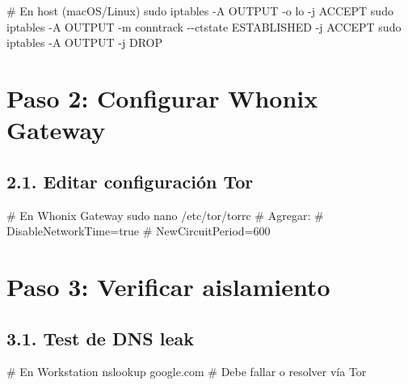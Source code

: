 \documentclass[
  letterpaper,
]{report}
\newenvironment{Shaded}{\begin{snugshade}}{\end{snugshade}}
\newcommand{\AttributeTok}[1]{\textcolor[rgb]{0.40,0.45,0.13}{#1}}
\newcommand{\CommentTok}[1]{\textcolor[rgb]{0.37,0.37,0.37}{#1}}
\newcommand{\ExtensionTok}[1]{\textcolor[rgb]{0.00,0.23,0.31}{#1}}
\newcommand{\FunctionTok}[1]{\textcolor[rgb]{0.28,0.35,0.67}{#1}}
\newcommand{\NormalTok}[1]{\textcolor[rgb]{0.00,0.23,0.31}{#1}}
\begin{document}
\begin{Shaded}
\begin{Highlighting}[]
\CommentTok{\# En host (macOS/Linux)}
\FunctionTok{sudo}\NormalTok{ iptables }\AttributeTok{{-}A}\NormalTok{ OUTPUT }\AttributeTok{{-}o}\NormalTok{ lo }\AttributeTok{{-}j}\NormalTok{ ACCEPT}
\FunctionTok{sudo}\NormalTok{ iptables }\AttributeTok{{-}A}\NormalTok{ OUTPUT }\AttributeTok{{-}m}\NormalTok{ conntrack }\AttributeTok{{-}{-}ctstate}\NormalTok{ ESTABLISHED }\AttributeTok{{-}j}\NormalTok{ ACCEPT}
\FunctionTok{sudo}\NormalTok{ iptables }\AttributeTok{{-}A}\NormalTok{ OUTPUT }\AttributeTok{{-}j}\NormalTok{ DROP}
\end{Highlighting}
\end{Shaded}

\section{Paso 2: Configurar Whonix
Gateway}\label{paso-2-configurar-whonix-gateway-1}

\subsection{2.1. Editar configuración
Tor}\label{editar-configuraciuxf3n-tor}

\begin{Shaded}
\begin{Highlighting}[]
\CommentTok{\# En Whonix Gateway}
\FunctionTok{sudo}\NormalTok{ nano /etc/tor/torrc}
\CommentTok{\# Agregar:}
\CommentTok{\# DisableNetworkTime=true}
\CommentTok{\# NewCircuitPeriod=600}
\end{Highlighting}
\end{Shaded}

\section{Paso 3: Verificar
aislamiento}\label{paso-3-verificar-aislamiento}

\subsection{3.1. Test de DNS leak}\label{test-de-dns-leak}

\begin{Shaded}
\begin{Highlighting}[]
\CommentTok{\# En Workstation}
\ExtensionTok{nslookup}\NormalTok{ google.com}
\CommentTok{\# Debe fallar o resolver vía Tor}
\end{Highlighting}
\end{Shaded}
\end{document}
